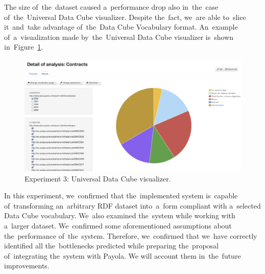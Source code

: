 The size of~the~dataset caused a~performance drop also in~the~case of~the~Universal Data Cube visualizer. Despite the~fact, we~are able to~slice it~and~take advantage of~the~Data Cube Vocabulary format. An~example of~a~visualization 
made by~the~Universal Data Cube visualizer is~shown in~Figure~\ref{fig:contracts-uni-dcv}.

\begin{figure}
  \centering
  \includegraphics[width=140mm]{img/contracts-uni-dcv.png}
  \caption{Experiment 3: Universal Data Cube visualizer.}
  \label{fig:contracts-uni-dcv}
\end{figure}

In this experiment, we~confirmed that the~implemented system is~capable of~transforming an~arbitrary RDF dataset into~a~form compliant with a~selected Data 
Cube vocabulary. We~also examined the~system while working with a~larger 
dataset. We~confirmed some aforementioned assumptions about the~performance of~the~system. Therefore, we~confirmed that we~have correctly identified all the~bottlenecks predicted while preparing the~proposal of~integrating the~system with Payola. 
We will account them in~the~future improvements.

